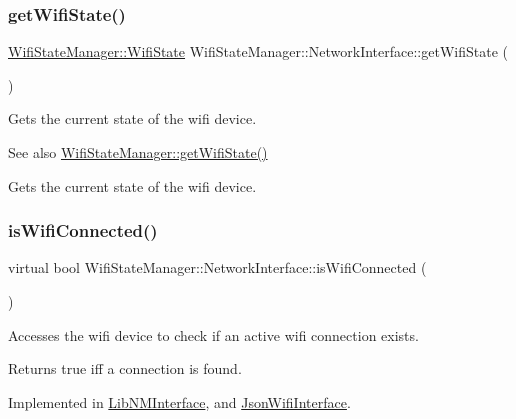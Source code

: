 \subsubsection{\texorpdfstring{get\+Wifi\+State()}{getWifiState()}}
{\footnotesize\ttfamily \mbox{\hyperlink{classWifiStateManager_a1b2ed840606c57c43d4a147c96d43128}{Wifi\+State\+Manager\+::\+Wifi\+State}} Wifi\+State\+Manager\+::\+Network\+Interface\+::get\+Wifi\+State (\begin{DoxyParamCaption}{ }\end{DoxyParamCaption})}

Gets the current state of the wifi device. \begin{DoxySeeAlso}{See also}
\mbox{\hyperlink{classWifiStateManager_a204b08dd7e75bf62cbf3eccf51acda8e}{Wifi\+State\+Manager\+::get\+Wifi\+State()}}
\end{DoxySeeAlso}
Gets the current state of the wifi device. \mbox{\label{classWifiStateManager_1_1NetworkInterface_a236b07174e3ab91973fce616746c0f70}} 
\subsubsection{\texorpdfstring{is\+Wifi\+Connected()}{isWifiConnected()}}
{\footnotesize\ttfamily virtual bool Wifi\+State\+Manager\+::\+Network\+Interface\+::is\+Wifi\+Connected (\begin{DoxyParamCaption}{ }\end{DoxyParamCaption})\hspace{0.3cm}{\ttfamily [pure virtual]}}

Accesses the wifi device to check if an active wifi connection exists.

\begin{DoxyReturn}{Returns}
true iff a connection is found. 
\end{DoxyReturn}


Implemented in \mbox{\hyperlink{classLibNMInterface_afb02b052a8c2a67ce2865d3faf689c39}{Lib\+N\+M\+Interface}}, and \mbox{\hyperlink{classJsonWifiInterface_abd6d4e6e67e47a13560263e96e644131}{Json\+Wifi\+Interface}}.

\mbox{\label{classWifiStateManager_1_1NetworkInterface_ade4c478d4b57628d39726f1b85a396f0}} 
